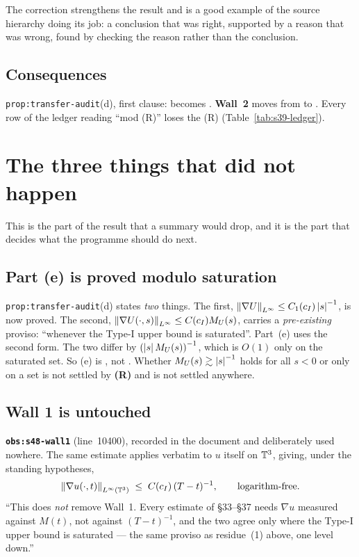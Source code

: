 The correction strengthens the result and is a good example of the source
hierarchy doing its job: a conclusion that was right, supported by a reason
that was wrong, found by checking the reason rather than the conclusion.

\subsection{Consequences}

\texttt{prop:transfer-audit}(d), first clause:  becomes
\PROVED{}. \textbf{Wall~2} moves from \OPEN{} to \WITHDRAWN{}. Every row of
the  ledger reading ``mod (R)'' loses the (R)
(Table~\ref{tab:s39-ledger}).

\section{The three things that did not happen}
\label{sec:s48-limits}

This is the part of the  result that a summary would drop, and it is
the part that decides what the programme should do next.

\subsection{Part (e) is proved modulo saturation}

\texttt{prop:transfer-audit}(d) states \emph{two} things. The first,
\(\left\|\nabla U\right\|_{L^\infty}\le C_1(c_I)\left|s\right|^{-1}\), is now proved. The
second, \(\left\|\nabla U(\cdot,s)\right\|_{L^\infty}\le C(c_I)M_U(s)\), carries a
\emph{pre-existing} proviso: ``whenever the Type-I upper bound is saturated''.
Part~(e) uses the second form. The two differ by
\(\left(\left|s\right|M_U(s)\right)^{-1}\), which is \(O(1)\) only on the saturated
set. So (e) is , not \PROVED{}. Whether
\(M_U(s)\gtrsim\left|s\right|^{-1}\) holds for all \(s<0\) or only on a set is not
settled by \textbf{(R)} and is not settled anywhere.

\subsection{Wall 1 is untouched}

\begin{record}
\textbf{\texttt{obs:s48-wall1}} (line~10400), recorded in the document and
deliberately used nowhere. The same estimate applies verbatim to \(u\) itself
on \(\mathbb{T}^3\), giving, under the standing hypotheses,
\[
  \left\|\nabla u(\cdot,t)\right\|_{L^\infty(\mathbb{T}^3)} \;\le\; C(c_I)\,(T-t)^{-1},
  \qquad\text{logarithm-free.}
\]
``This does \emph{not} remove Wall~1. Every estimate of \S33--\S37 needs
\(\nabla u\) measured against \(M(t)\), not against \((T-t)^{-1}\), and the two
agree only where the Type-I upper bound is saturated --- the same proviso as
residue~(1) above, one level down.''
\end{record}


